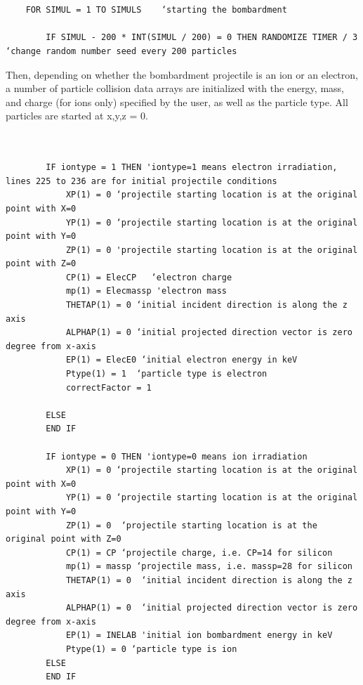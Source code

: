\documentclass[10pt, reqno]{exam}
\begin{document}
\begin{verbatim}


    FOR SIMUL = 1 TO SIMULS    ‘starting the bombardment 
    
        IF SIMUL - 200 * INT(SIMUL / 200) = 0 THEN RANDOMIZE TIMER / 3  ‘change random number seed every 200 particles
\end{verbatim}
Then, depending on whether the bombardment projectile is an ion or an electron, a number of particle collision data arrays are initialized with the energy, mass, and charge (for ions only) specified by the user, as well as the particle type. All particles are started at x,y,z = 0. \par
\begin{verbatim}
    

        IF iontype = 1 THEN 'iontype=1 means electron irradiation, lines 225 to 236 are for initial projectile conditions
            XP(1) = 0 ‘projectile starting location is at the original point with X=0
            YP(1) = 0 ‘projectile starting location is at the original point with Y=0
            ZP(1) = 0 'projectile starting location is at the original point with Z=0
            CP(1) = ElecCP   ‘electron charge
            mp(1) = Elecmassp 'electron mass
            THETAP(1) = 0 ‘initial incident direction is along the z axis
            ALPHAP(1) = 0 ‘initial projected direction vector is zero degree from x-axis
            EP(1) = ElecE0 ‘initial electron energy in keV
            Ptype(1) = 1  ‘particle type is electron
            correctFactor = 1  
    
        ELSE
        END IF
    
        IF iontype = 0 THEN 'iontype=0 means ion irradiation
            XP(1) = 0 ‘projectile starting location is at the original point with X=0
            YP(1) = 0 ‘projectile starting location is at the original point with Y=0
            ZP(1) = 0  ‘projectile starting location is at the original point with Z=0
            CP(1) = CP ‘projectile charge, i.e. CP=14 for silicon 
            mp(1) = massp ‘projectile mass, i.e. massp=28 for silicon
            THETAP(1) = 0  ‘initial incident direction is along the z axis
            ALPHAP(1) = 0  ‘initial projected direction vector is zero degree from x-axis
            EP(1) = INELAB 'initial ion bombardment energy in keV
            Ptype(1) = 0 ‘particle type is ion
        ELSE
        END IF
\end{verbatim}
\end{document}
